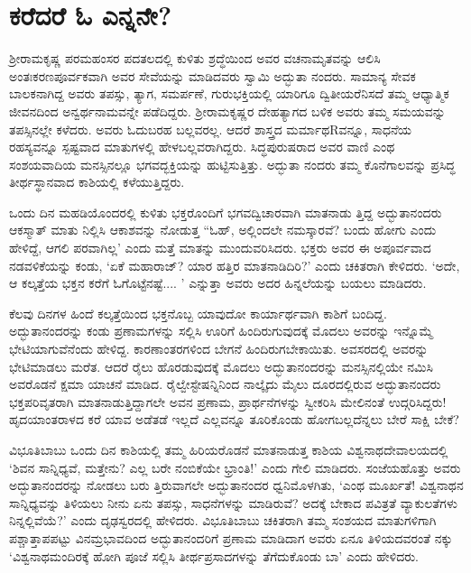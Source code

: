 \section{ಕರೆದರೆ ಓ ಎನ್ನನೇ?}

ಶ‍್ರೀರಾಮಕೃಷ್ಣ ಪರಮಹಂಸರ ಪದತಲದಲ್ಲಿ ಕುಳಿತು ಶ್ರದ್ಧೆಯಿಂದ ಅವರ ವಚನಾಮೃತವನ್ನು ಆಲಿಸಿ ಅಂತಃಕರಣಪೂರ್ವಕವಾಗಿ ಅವರ ಸೇವೆಯನ್ನು ಮಾಡಿದವರು ಸ್ವಾಮಿ ಅದ್ಭುತಾ ನಂದರು. ಸಾಮಾನ್ಯ ಸೇವಕ ಬಾಲಕನಾಗಿದ್ದ ಅವರು ತಪಸ್ಸು, ತ್ಯಾಗ, ಸಮರ್ಪಣೆ, ಗುರುಭಕ್ತಿಯಲ್ಲಿ ಯಾರಿಗೂ ದ್ವಿತೀಯರೆನಿಸದೆ ತಮ್ಮ ಆಧ್ಯಾತ್ಮಿಕ ಜೀವನದಿಂದ ಅನ್ವರ್ಥನಾಮವನ್ನೇ ಪಡೆದಿದ್ದರು. ಶ‍್ರೀರಾಮಕೃಷ್ಣರ ದೇಹತ್ಯಾಗದ ಬಳಿಕ ಅವರು ತಮ್ಮ ಸಮಯವನ್ನು ತಪಸ್ಸಿನಲ್ಲೇ ಕಳೆದರು. ಅವರು ಓದುಬರಹ ಬಲ್ಲವರಲ್ಲ. ಆದರೆ ಶಾಸ್ತ್ರದ ಮರ್ಮಾಥRವನ್ನೂ, ಸಾಧನೆಯ ರಹಸ್ಯವನ್ನೂ ಸ್ಪಷ್ಟವಾದ ಮಾತುಗಳಲ್ಲಿ ಹೇಳಬಲ್ಲವರಾಗಿದ್ದರು. ಸಿದ್ಧಪುರುಷರಾದ ಅವರ ವಾಣಿ ಎಂಥ ಸಂಶಯವಾದಿಯ ಮನಸ್ಸಿನಲ್ಲೂ ಭಗವದ್ಭಕ್ತಿಯನ್ನು ಹುಟ್ಟಿಸುತ್ತಿತ್ತು. ಅದ್ಭುತಾ ನಂದರು ತಮ್ಮ ಕೊನೆಗಾಲವನ್ನು ಪ್ರಸಿದ್ಧ ತೀರ್ಥಸ್ಥಾನವಾದ ಕಾಶಿಯಲ್ಲಿ ಕಳೆಯುತ್ತಿದ್ದರು.

ಒಂದು ದಿನ ಮಹಡಿಯೊಂದರಲ್ಲಿ ಕುಳಿತು ಭಕ್ತರೊಂದಿಗೆ ಭಗವದ್ವಿಚಾರವಾಗಿ ಮಾತನಾಡು ತ್ತಿದ್ದ ಅದ್ಭುತಾನಂದರು ಆಕಸ್ಮಾತ್ ಮಾತು ನಿಲ್ಲಿಸಿ ಆಕಾಶವನ್ನು ನೋಡುತ್ತ “ಓಹ್, ಅಲ್ಲಿಂದಲೇ ನಮಸ್ಕಾರವೆ? ಬಂದು ಹೋಗು ಎಂದು ಹೇಳಿದ್ದೆ, ಆಗಲಿ ಪರವಾಗಿಲ್ಲ’ ಎಂದು ಮತ್ತೆ ಮಾತನ್ನು ಮುಂದುವರಿಸಿದರು. ಭಕ್ತರು ಅವರ ಈ ಅಪೂರ್ವವಾದ ನಡವಳಿಕೆಯನ್ನು ಕಂಡು, ‘ಏಕೆ ಮಹಾರಾಜ್​? ಯಾರ ಹತ್ತಿರ ಮಾತನಾಡಿದಿರಿ?’ ಎಂದು ಚಕಿತರಾಗಿ ಕೇಳಿದರು. ‘ಅದೇ, ಆ ಕಲ್ಕತ್ತೆಯ ಭಕ್ತನ ಕರೆಗೆ ಓಗೊಟ್ಟೆನಷ್ಟೆ.... ’ ಎನ್ನುತ್ತಾ ಅವರು ಅದರ ಹಿನ್ನಲೆಯನ್ನು ಬಯಲು ಮಾಡಿದರು.

ಕೆಲವು ದಿನಗಳ ಹಿಂದೆ ಕಲ್ಕತ್ತೆಯಿಂದ ಭಕ್ತನೊಬ್ಬ ಯಾವುದೋ ಕಾರ್ಯಾರ್ಥವಾಗಿ ಕಾಶಿಗೆ ಬಂದಿದ್ದ. ಅದ್ಭುತಾನಂದರನ್ನು ಕಂಡು ಪ್ರಣಾಮಗಳನ್ನು ಸಲ್ಲಿಸಿ ಊರಿಗೆ ಹಿಂದಿರುಗುವುದಕ್ಕೆ ಮೊದಲು ಅವರನ್ನು ಇನ್ನೊಮ್ಮೆ ಭೇಟಿಯಾಗುವೆನೆಂದು ಹೇಳಿದ್ದ. ಕಾರಣಾಂತರಗಳಿಂದ ಬೇಗನೆ ಹಿಂದಿರುಗಬೇಕಾಯಿತು. ಅವಸರದಲ್ಲಿ ಅವರನ್ನು ಭೇಟಿಮಾಡಲು ಮರೆತ. ಆದರೆ ರೈಲು ಹೊರಡುವುದಕ್ಕೆ ಮೊದಲು ಅದ್ಭುತಾನಂದರನ್ನು ಮನಸ್ಸಿನಲ್ಲಿಯೇ ನಮಿಸಿ ಅವರೊಡನೆ ಕ್ಷಮಾ ಯಾಚನೆ ಮಾಡಿದ. ರೈಲ್ವೇಸ್ಟೇಷನ್ನಿನಿಂದ ನಾಲ್ಕೈದು ಮೈಲು ದೂರದಲ್ಲಿರುವ ಅದ್ಭುತಾನಂದರು ಭಕ್ತಪರಿವೃತರಾಗಿ ಮಾತನಾಡುತ್ತಿದ್ದಾಗಲೇ ಅವನ ಪ್ರಣಾಮ, ಪ್ರಾರ್ಥನೆಗಳನ್ನು ಸ್ವೀಕರಿಸಿ ಮೇಲಿನಂತೆ ಉದ್ಗರಿಸಿದ್ದರು! ಹೃದಯಾಂತರಾಳದ ಕರೆ ಯಾವ ಅಡೆತಡೆ ಇಲ್ಲದೆ ಎಲ್ಲವನ್ನೂ ತೂರಿಕೊಂಡು ಹೋಗಬಲ್ಲದೆನ್ನಲು ಬೇರೆ ಸಾಕ್ಷಿ ಬೇಕೆ?

ವಿಭೂತಿಬಾಬು ಒಂದು ದಿನ ಕಾಶಿಯಲ್ಲಿ ತಮ್ಮ ಹಿರಿಯರೊಡನೆ ಮಾತನಾಡುತ್ತ ಕಾಶಿಯ ವಿಶ್ವನಾಥದೇವಾಲಯದಲ್ಲಿ ‘ಶಿವನ ಸಾನ್ನಿಧ್ಯವೆ, ಮತ್ತೇನು? ಎಲ್ಲ ಬರೇ ನಂಬಿಕೆಯೇ ಭ್ರಾಂತಿ!’ ಎಂದು ಗೇಲಿ ಮಾಡಿದರು. ಸಂಜೆಯಹೊತ್ತು ಅವರು ಅದ್ಭುತಾನಂದರನ್ನು ನೋಡಲು ಬರು ತ್ತಿರುವಾಗಲೇ ಅದ್ಭುತಾನಂದರ ಧ್ವನಿಮೊಳಗಿತು, ‘ಎಂಥ ಮೂರ್ಖತೆ! ವಿಶ್ವನಾಥನ ಸಾನ್ನಿಧ್ಯವನ್ನು ತಿಳಿಯಲು ನೀನು ಏನು ತಪಸ್ಸು, ಸಾಧನೆಗಳನ್ನು ಮಾಡಿರುವೆ? ಅದಕ್ಕೆ ಬೇಕಾದ ಪವಿತ್ರತೆ ವ್ಯಾಕುಲತೆಗಳು ನಿನ್ನಲ್ಲಿವೆಯೆ?’ ಎಂದು ದೃಢಸ್ವರದಲ್ಲಿ ಹೇಳಿದರು. ವಿಭೂತಿಬಾಬು ಚಕಿತರಾಗಿ ತಮ್ಮ ಸಂಶಯದ ಮಾತುಗಳಿಗಾಗಿ ಪಶ್ಚಾತ್ತಾಪಪಟ್ಟು ವಿನಮ್ರಭಾವದಿಂದ ಅದ್ಭುತಾನಂದರಿಗೆ ಪ್ರಣಾಮ ಮಾಡಿದಾಗ ಅವರು ಏನೂ ತಿಳಿಯದವರಂತೆ ನಕ್ಕು ‘ವಿಶ್ವನಾಥಮಂದಿರಕ್ಕೆ ಹೋಗಿ ಪೂಜೆ ಸಲ್ಲಿಸಿ ತೀರ್ಥಪ್ರಸಾದಗಳನ್ನು ತೆಗೆದುಕೊಂಡು ಬಾ’ ಎಂದು ಹೇಳಿದರು.

